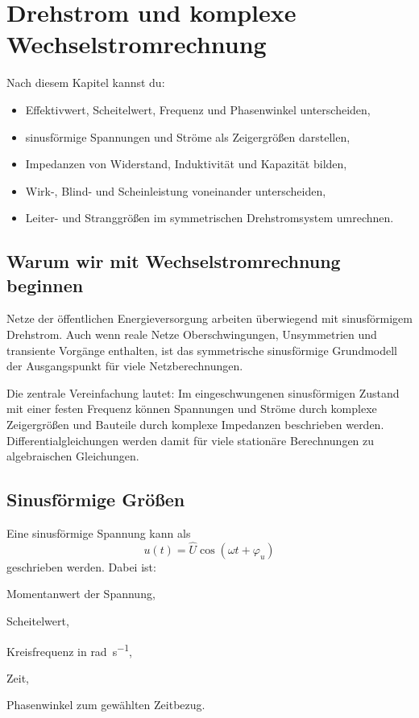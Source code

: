 \chapter{Drehstrom und komplexe Wechselstromrechnung}
\label{chap:drehstrom}

\begin{lernziel}
Nach diesem Kapitel kannst du:
\begin{itemize}
  \item Effektivwert, Scheitelwert, Frequenz und Phasenwinkel unterscheiden,
  \item sinusförmige Spannungen und Ströme als Zeigergrößen darstellen,
  \item Impedanzen von Widerstand, Induktivität und Kapazität bilden,
  \item Wirk-, Blind- und Scheinleistung voneinander unterscheiden,
  \item Leiter- und Stranggrößen im symmetrischen Drehstromsystem umrechnen.
\end{itemize}
\end{lernziel}

\section{Warum wir mit Wechselstromrechnung beginnen}

Netze der öffentlichen Energieversorgung arbeiten überwiegend mit
sinusförmigem Drehstrom. Auch wenn reale Netze Oberschwingungen, Unsymmetrien
und transiente Vorgänge enthalten, ist das symmetrische sinusförmige
Grundmodell der Ausgangspunkt für viele Netzberechnungen.

Die zentrale Vereinfachung lautet: Im eingeschwungenen sinusförmigen Zustand
mit einer festen Frequenz können Spannungen und Ströme durch komplexe
Zeigergrößen und Bauteile durch komplexe Impedanzen beschrieben werden.
Differentialgleichungen werden damit für viele stationäre Berechnungen zu
algebraischen Gleichungen.

\section{Sinusförmige Größen}

Eine sinusförmige Spannung kann als
\begin{equation}
  u(t)=\hat U\cos(\omega t+\varphi_u)
  \label{eq:sinusspannung}
\end{equation}
geschrieben werden. Dabei ist:
\begin{description}[style=nextline]
  \item[$u(t)$] Momentanwert der Spannung,
  \item[$\hat U$] Scheitelwert,
  \item[$\omega$] Kreisfrequenz in \si{\radian\per\second},
  \item[$t$] Zeit,
  \item[$\varphi_u$] Phasenwinkel zum gewählten Zeitbezug.
\end{description}

